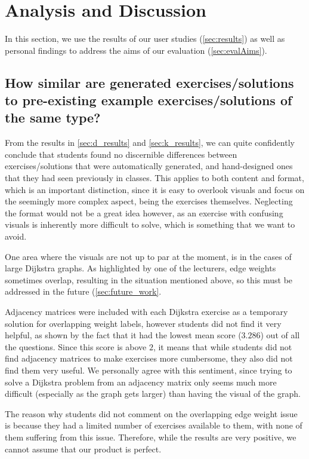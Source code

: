 \documentclass{l4proj}
\begin{document}
\section{Analysis and Discussion}
\label{sec:analysis}

In this section, we use the results of our user studies (\autoref{sec:results}) as well as personal findings to address the aims of our evaluation (\autoref{sec:evalAims}).

\subsection*{How similar are generated exercises/solutions to pre-existing example exercises/solutions of the same type?}

From the results in \autoref{sec:d_results} and \autoref{sec:k_results}, we can quite confidently conclude that students found no discernible differences between exercises/solutions that were automatically generated, and hand-designed ones that they had seen previously in classes. This applies to both content and format, which is an important distinction, since it is easy to overlook visuals and focus on the seemingly more complex aspect, being the exercises themselves. Neglecting the format would not be a great idea however, as an exercise with confusing visuals is inherently more difficult to solve, which is something that we want to avoid.

One area where the visuals are not up to par at the moment, is in the cases of large Dijkstra graphs. As highlighted by one of the lecturers, edge weights sometimes overlap, resulting in the situation mentioned above, so this must be addressed in the future (\autoref{sec:future_work}. 

Adjacency matrices were included with each Dijkstra exercise as a temporary solution for overlapping weight labels, however students did not find it very helpful, as shown by the fact that it had the lowest mean score ($3.286$) out of all the questions. Since this score is above $2$, it means that while students did not find adjacency matrices to make exercises more cumbersome, they also did not find them very useful. We personally agree with this sentiment, since trying to solve a Dijkstra problem from an adjacency matrix only seems much more difficult (especially as the graph gets larger) than having the visual of the graph.

The reason why students did not comment on the overlapping edge weight issue is because they had a limited number of exercises available to them, with none of them suffering from this issue. Therefore, while the results are very positive, we cannot assume that our product is perfect.
\end{document}
